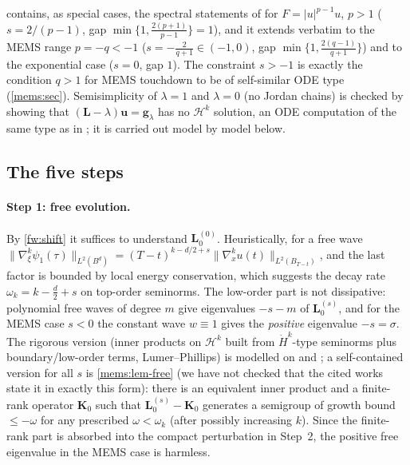 \begin{remark}
 contains, as special cases, the spectral statements of
\cite{DonningerSchoerkhuber2012,DonningerSchoerkhuber2014,DonningerSchoerkhuber2017,Ostermann2024}
for $F=|u|^{p-1}u$, $p>1$ ($s=2/(p-1)$, gap $\min\{1,\frac{2(p+1)}{p-1}\}=1$),
and it extends verbatim to the MEMS range $p=-q<-1$
($s=-\frac{2}{q+1}\in(-1,0)$, gap $\min\{1,\frac{2(q-1)}{q+1}\}$) and to the
exponential case ($s=0$, gap $1$). The constraint $s>-1$ is exactly the
condition $q>1$ for MEMS touchdown to be of self-similar ODE type
(\cref{mems:sec}). Semisimplicity of $\lambda=1$ and $\lambda=0$ (no Jordan
chains) is checked by showing that $(\mathbf L-\lambda)\mathbf u=\mathbf
g_\lambda$ has no $\mathcal H^k$ solution, an ODE computation of the same
type as in \cite{DonningerSchoerkhuber2017,Ostermann2024}; it is carried
out model by model below.
\end{remark}

\subsection{The five steps}
\label{fw:subsec-steps}
\paragraph{Step 1: free evolution.} By \eqref{fw:shift} it suffices to
understand $\mathbf L_0^{(0)}$. Heuristically, for a free wave
$\|\nabla_\xi^k\psi_1(\tau)\|_{L^2(B^d)}=(T-t)^{k-d/2+s}\|\nabla_x^ku(t)\|_{L^2(B_{T-t})}$,
and the last factor is bounded by local energy conservation, which suggests
the decay rate $\omega_k=k-\frac d2+s$ on top-order seminorms. The low-order
part is not dissipative: polynomial free waves of degree $m$ give eigenvalues
$-s-m$ of $\mathbf L_0^{(s)}$, and for the MEMS case $s<0$ the constant
wave $w\equiv1$ gives the \emph{positive} eigenvalue $-s=\sigma$. The rigorous
version (inner products on $\mathcal H^k$ built from $\dot H^k$-type
seminorms plus boundary/low-order terms, Lumer--Phillips) is modelled on
\cite{Ostermann2024} and \cite{Glogic2025}; a self-contained version for all
$s$ is \cref{mems:lem-free} (we have not checked that the cited works state
it in exactly this form): there is an equivalent
inner product and a finite-rank operator $\mathbf K_0$ such that
$\mathbf L_0^{(s)}-\mathbf K_0$ generates a semigroup of growth bound
$\le-\omega$ for any prescribed $\omega<\omega_k$ (after possibly increasing
$k$). Since the finite-rank part is absorbed into the compact perturbation in
Step~2, the positive free eigenvalue in the MEMS case is harmless.

